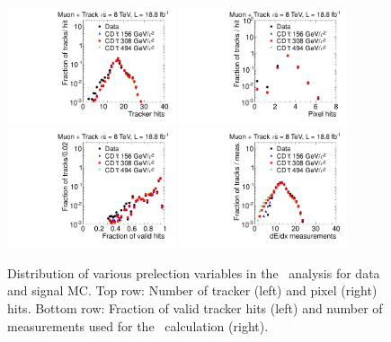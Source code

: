 \begin{figure}
\centering
  \includegraphics[clip=true, trim=0.0cm 0cm 2.8cm 0cm, width=0.44\textwidth]{figures/tkmu/Selection_Comp_8TeV_GMStau_NOH_BS}
  \includegraphics[clip=true, trim=0.0cm 0cm 2.8cm 0cm, width=0.44\textwidth]{figures/tkmu/Selection_Comp_8TeV_GMStau_NOPH_BS} \\
  \includegraphics[clip=true, trim=0.0cm 0cm 2.8cm 0cm, width=0.44\textwidth]{figures/tkmu/Selection_Comp_8TeV_GMStau_NOHFraction_BS}
  \includegraphics[clip=true, trim=0.0cm 0cm 2.8cm 0cm, width=0.44\textwidth]{figures/tkmu/Selection_Comp_8TeV_GMStau_NOM_BS}
  \caption[Distribution of number of tracker and pixel hits, fraction of valid tracker hits, and number of \dedx\ measurements in the \tktof\ analysis for data and signal MC.]
{Distribution of various prelection variables in the \tktof\ analysis for data and signal MC.
Top row: Number of tracker (left) and pixel (right) hits.
Bottom row: Fraction of valid tracker hits (left) and number of measurements used for the \dedx\ calculation (right).}
    \label{fig:TkMuPreselA}
\end{figure}

